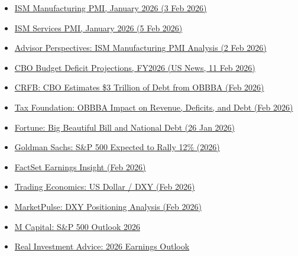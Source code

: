 \documentclass{wilson-report}
\begin{document}
\small
\begin{itemize}[leftmargin=1.2em, itemsep=2pt]
  \item \href{https://www.prnewswire.com/news-releases/manufacturing-pmi-at-52-6-january-2026-ism-manufacturing-pmi-report-302675443.html}{ISM Manufacturing PMI, January 2026 (3 Feb 2026)}
  \item \href{https://www.prnewswire.com/news-releases/services-pmi-at-53-8-january-2026-ism-services-pmi-report-302678227.html}{ISM Services PMI, January 2026 (5 Feb 2026)}
  \item \href{https://www.advisorperspectives.com/dshort/updates/2026/02/02/ism-manufacturing-pmi-strongest-expansion-january-2026}{Advisor Perspectives: ISM Manufacturing PMI Analysis (2 Feb 2026)}
  \item \href{https://money.usnews.com/investing/news/articles/2026-02-11/us-budget-deficit-to-grow-to-1-853-trillion-in-fy2026-cbo-says}{CBO Budget Deficit Projections, FY2026 (US News, 11 Feb 2026)}
  \item \href{https://www.crfb.org/blogs/cbo-estimates-3-trillion-debt-house-passed-obbba}{CRFB: CBO Estimates \$3 Trillion of Debt from OBBBA (Feb 2026)}
  \item \href{https://taxfoundation.org/blog/obbba-debt-deficits-tax-revenue/}{Tax Foundation: OBBBA Impact on Revenue, Deficits, and Debt (Feb 2026)}
  \item \href{https://fortune.com/2026/01/26/trump-big-beautiful-bill-national-debt-crisis/}{Fortune: Big Beautiful Bill and National Debt (26 Jan 2026)}
  \item \href{https://www.goldmansachs.com/insights/articles/the-sp-500-expected-to-rally-12-this-year}{Goldman Sachs: S\&P 500 Expected to Rally 12\% (2026)}
  \item \href{https://www.factset.com/earningsinsight}{FactSet Earnings Insight (Feb 2026)}
  \item \href{https://tradingeconomics.com/united-states/currency}{Trading Economics: US Dollar / DXY (Feb 2026)}
  \item \href{https://www.marketpulse.com/markets/us-dollar-pushes-higher-to-start-week/}{MarketPulse: DXY Positioning Analysis (Feb 2026)}
  \item \href{https://www.mcapitalmgt.com/blog/market-insights-what-2026-could-hold-for-the-sp-500/}{M Capital: S\&P 500 Outlook 2026}
  \item \href{https://realinvestmentadvice.com/resources/blog/2026-earnings-outlook-another-year-of-optimism/}{Real Investment Advice: 2026 Earnings Outlook}
\end{itemize}

\signoff
\end{document}
